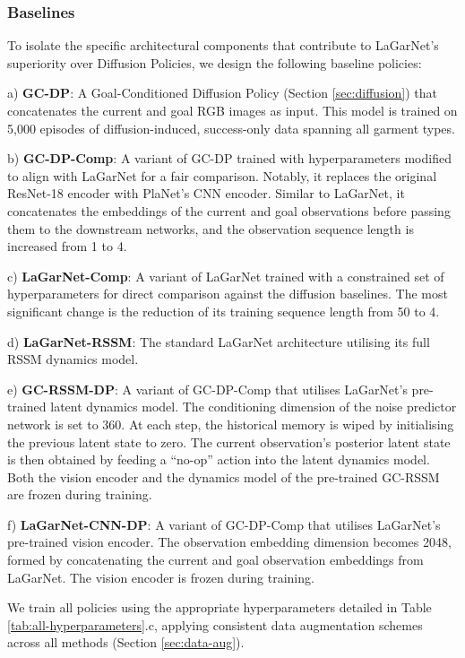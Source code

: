 \documentclass[journal]{IEEEtran}
\begin{document}
\subsubsection{Baselines} \label{sec:diff-baselines}

To isolate the specific architectural components that contribute to LaGarNet's superiority over Diffusion Policies, we design the following baseline policies:

a) \textbf{GC-DP}: A Goal-Conditioned Diffusion Policy (Section \ref{sec:diffusion}) that concatenates the current and goal RGB images as input. This model is trained on 5,000 episodes of diffusion-induced, success-only data spanning all garment types.

b) \textbf{GC-DP-Comp}: A variant of GC-DP trained with hyperparameters modified to align with LaGarNet for a fair comparison. Notably, it replaces the original ResNet-18 encoder with PlaNet's CNN encoder. Similar to LaGarNet, it concatenates the embeddings of the current and goal observations before passing them to the downstream networks, and the observation sequence length is increased from 1 to 4.

c) \textbf{LaGarNet-Comp}: A variant of LaGarNet trained with a constrained set of hyperparameters for direct comparison against the diffusion baselines. The most significant change is the reduction of its training sequence length from 50 to 4.

d) \textbf{LaGarNet-RSSM}: The standard LaGarNet architecture utilising its full RSSM dynamics model.

e) \textbf{GC-RSSM-DP}: A variant of GC-DP-Comp that utilises LaGarNet's pre-trained latent dynamics model. The conditioning dimension of the noise predictor network is set to 360. At each step, the historical memory is wiped by initialising the previous latent state to zero. The current observation's posterior latent state is then obtained by feeding a ``no-op'' action into the latent dynamics model. Both the vision encoder and the dynamics model of the pre-trained GC-RSSM are frozen during training.

f) \textbf{LaGarNet-CNN-DP}: A variant of GC-DP-Comp that utilises LaGarNet's pre-trained vision encoder. The observation embedding dimension becomes 2048, formed by concatenating the current and goal observation embeddings from LaGarNet. The vision encoder is frozen during training.

We train all policies using the appropriate hyperparameters detailed in Table \ref{tab:all-hyperparameters}.c, applying consistent data augmentation schemes across all methods (Section \ref{sec:data-aug}).
\end{document}
